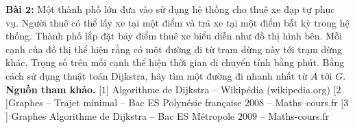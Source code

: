 \begin{multicols}{2}
\begin{figure}[H]
	\end{figure}
	\textbf{\color{quantoan}Bài $\pmb{2}$:} Một thành phố lớn đưa vào sử dụng hệ thống cho thuê xe đạp tự phục vụ. Người thuê có thể lấy xe tại một điểm và trả xe tại một điểm bất kỳ trong hệ thống. Thành phố lắp đặt bảy điểm thuê xe biểu diễn như đồ thị hình bên. Mỗi cạnh của đồ thị thể hiện rằng có một đường đi từ trạm dừng này tới trạm dừng khác. Trọng số trên mỗi cạnh thể hiện thời gian di chuyển tính bằng phút. Bằng cách sử dụng thuật toán Dijkstra, hãy tìm một đường đi nhanh nhất từ $A$ tới $G$.
	\vskip 0.1cm	 
	\textbf{\color{quantoan}Nguồn tham khảo.} 
	\vskip 0.1cm
	[$1$] Algorithme de Dijkstra -- Wikipédia (wikipedia.org)
	\vskip 0.1cm
	[$2$]Graphes -- Trajet minimal -- Bac ES Polynésie française $2008$ -- Maths--cours.fr
	\vskip 0.1cm
	[$3$] Graphes Algorithme de Dijkstra -- Bac ES Métropole $2009$ -- Maths-cours.fr
\end{multicols}
